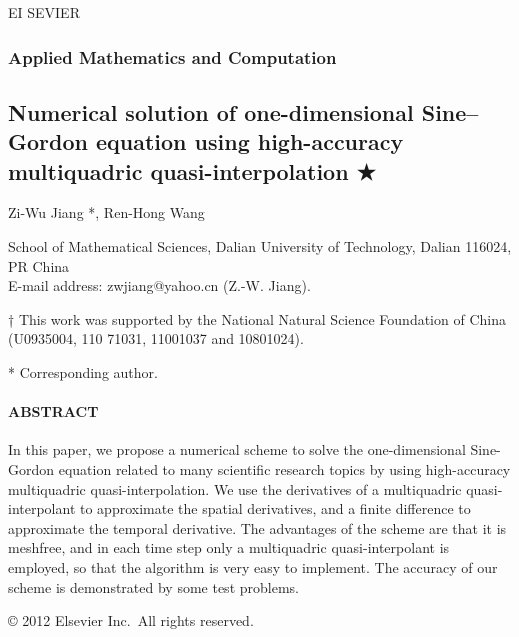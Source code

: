 \documentclass[12pt]{article}
\author{}
\date{}
\begin{document}
\protect\hypertarget{page-0-0}{}{}EI SEVIER


\hypertarget{applied-mathematics-and-computation}{%
\subsubsection{\texorpdfstring{\textbf{Applied Mathematics and
Computation}}{Applied Mathematics and Computation}}\label{applied-mathematics-and-computation}}

\hypertarget{numerical-solution-of-one-dimensional-sinegordon-equation-using-high-accuracy-multiquadric-quasi-interpolation}{%
\subsection{Numerical solution of one-dimensional Sine--Gordon equation using high-accuracy multiquadric quasi-interpolation
★}\label{numerical-solution-of-one-dimensional-sinegordon-equation-using-high-accuracy-multiquadric-quasi-interpolation}}

Zi-Wu Jiang *, Ren-Hong Wang

School of Mathematical Sciences, Dalian University of Technology, Dalian
116024, PR China \\

E-mail address: zwjiang@yahoo.cn (Z.-W. Jiang).

† This work was supported by the National Natural Science Foundation of China (U0935004, 110 71031, 11001037 and 10801024).

* Corresponding author.

\hypertarget{abstract}{%
\paragraph{ABSTRACT}\label{abstract}}

In this paper, we propose a numerical scheme to solve the one-dimensional Sine-Gordon equation related to many scientific research topics by using high-accuracy multiquadric quasi-interpolation. We use the derivatives of a multiquadric quasi-interpolant to approximate the spatial derivatives, and a finite difference to approximate the temporal derivative. The advantages of the scheme are that it is meshfree, and in each time step only a multiquadric quasi-interpolant is employed, so that the algorithm is very easy to implement. The accuracy of our scheme is demonstrated by some test problems.

© 2012 Elsevier Inc.~All rights reserved.
\end{document}
